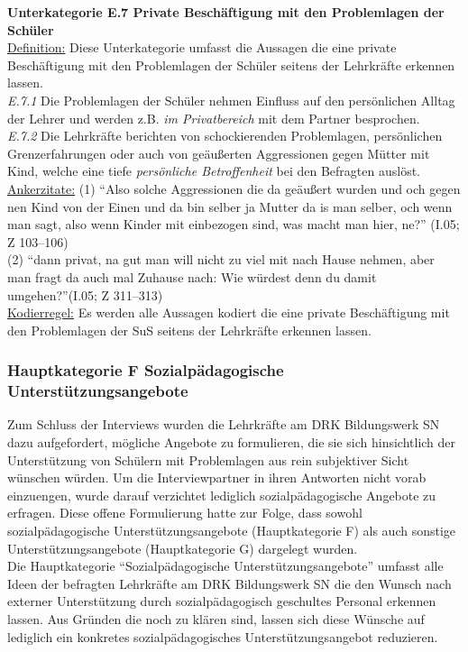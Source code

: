 \noindent
\textbf{Unterkategorie E.7 Private Beschäftigung mit den Problemlagen der Schüler}\\
\underline{Definition:} Diese Unterkategorie umfasst die Aussagen die eine private Beschäftigung mit den Problemlagen der Schüler seitens der Lehrkräfte erkennen lassen.\\
\textit{E.7.1} Die Problemlagen der Schüler nehmen Einfluss auf den persönlichen Alltag der Lehrer und werden z.B. \textit{im Privatbereich} mit dem Partner besprochen.\\
\textit{E.7.2} Die Lehrkräfte berichten von schockierenden Problemlagen, persönlichen Grenzerfahrungen oder auch von geäußerten Aggressionen gegen Mütter mit Kind, welche eine tiefe \textit{persönliche Betroffenheit} bei den Befragten auslöst.\\
\underline{Ankerzitate:} (1) "`Also solche Aggressionen die da geäußert wurden und och gegen nen Kind von der Einen und da bin selber ja Mutter da is man selber, och wenn man sagt, also wenn Kinder mit einbezogen sind, was macht man hier, ne?"' (I.05; Z 103--106)\\ (2) "`dann privat, na gut man will nicht zu viel mit nach Hause nehmen, aber man fragt da auch mal Zuhause nach: Wie würdest denn du damit umgehen?"'(I.05; Z 311--313)\\
\underline{Kodierregel:} Es werden alle Aussagen kodiert die eine private Beschäftigung mit den Problemlagen der SuS seitens der Lehrkräfte erkennen lassen.

\subsubsection{Hauptkategorie F Sozialpädagogische Unterstützungsangebote}
\label{sec:HauptkategorieFSozialpädagogischeUnterstützungsangebote}

Zum Schluss der Interviews wurden die Lehrkräfte am DRK Bildungswerk SN dazu aufgefordert, mögliche Angebote zu formulieren, die sie sich hinsichtlich der Unterstützung von Schülern mit Problemlagen aus rein subjektiver Sicht wünschen würden. Um die Interviewpartner in ihren Antworten nicht vorab einzuengen, wurde darauf verzichtet lediglich sozialpädagogische Angebote zu erfragen. Diese offene Formulierung hatte zur Folge, dass sowohl sozialpädagogische Unterstützungsangebote (Hauptkategorie F) als auch sonstige Unterstützungsangebote (Hauptkategorie G) dargelegt wurden.\\
Die Hauptkategorie "`Sozialpädagogische Unterstützungsangebote"' umfasst alle Ideen der befragten Lehrkräfte am DRK Bildungswerk SN die den Wunsch nach externer Unterstützung durch sozialpädagogisch geschultes Personal erkennen lassen. Aus Gründen die noch zu klären sind, lassen sich diese Wünsche auf lediglich ein konkretes sozialpädagogisches Unterstützungsangebot reduzieren.\\

